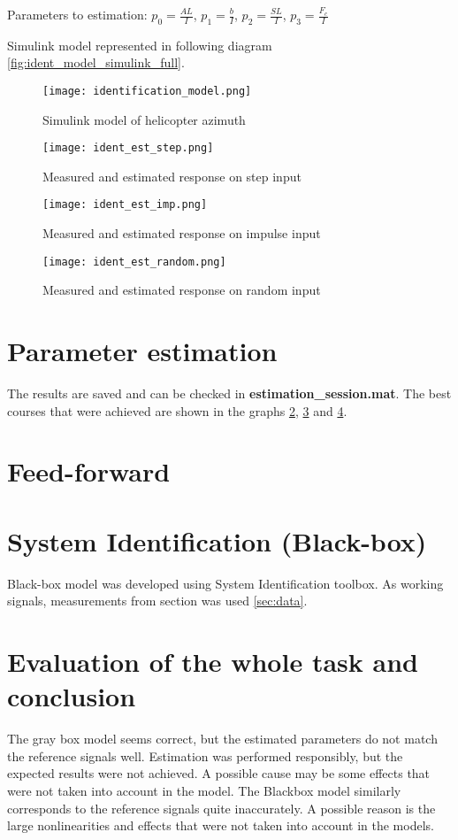 Parameters to estimation:
$p_0 = \frac{AL}{I}$, $p_1 = \frac{b}{I}$, $p_2 = \frac{SL}{I}$, $p_3 =
\frac{F_c}{I}$

Simulink model represented in following diagram
\ref{fig:ident_model_simulink_full}.
\begin{figure}[htb!]
    \centering
    \texttt{[image: identification\_model.png]}
    \caption{Simulink model of helicopter azimuth}
    \label{fig:identification_model}
\end{figure}

\begin{figure}[htb!]
    \centering
    \texttt{[image: ident\_est\_step.png]}
    \caption{Measured and estimated response on step input}
    \label{fig:est_step}
\end{figure}
\begin{figure}[htb!]
    \centering
    \texttt{[image: ident\_est\_imp.png]}
    \caption{Measured and estimated response on impulse input}
    \label{fig:est_imp}
\end{figure}
\begin{figure}[htb!]
    \centering
    \texttt{[image: ident\_est\_random.png]}
    \caption{Measured and estimated response on random input}
    \label{fig:est_random}
\end{figure}

\newpage
\section{Parameter estimation}

The results are saved and can be checked in \textbf{estimation\_session.mat}.
The best courses that were achieved are shown in the graphs
\ref{fig:est_step}, \ref{fig:est_imp} and \ref{fig:est_random}.   


\section{Feed-forward}

\newpage
\section{System Identification (Black-box)}
Black-box model was developed using System Identification toolbox. As
working signals, measurements from section was used \ref{sec:data}.


\newpage
\section{Evaluation of the whole task and conclusion}
The gray box model seems correct, but the estimated parameters do not match
the reference signals well. Estimation was performed responsibly, but the
expected results were not achieved. A possible cause may be some effects
that were not taken into account in the model. The Blackbox model similarly
corresponds to the reference signals quite inaccurately. A possible reason
is the large nonlinearities and effects that were not taken into account in
the models.
